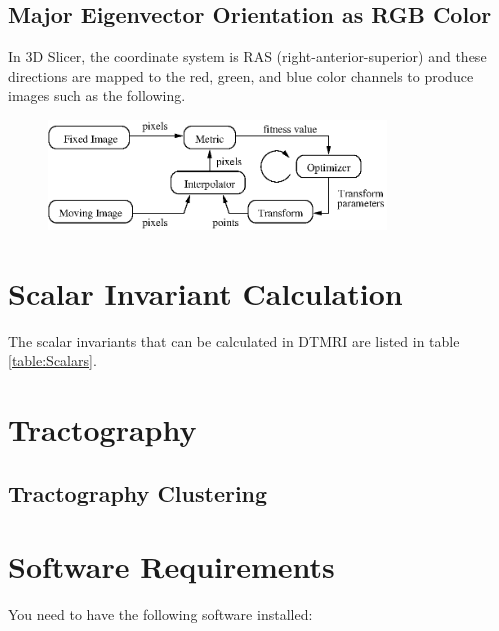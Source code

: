 \documentclass{InsightArticle}
\begin{document}
\subsection{Major Eigenvector Orientation as RGB Color}

In 3D Slicer, the coordinate system is RAS (right-anterior-superior)
and these directions are mapped to the red, green, and blue color
channels to produce images such as the following.


%
%

\begin{figure}
\center
\includegraphics[width=0.8\textwidth]{RegistrationComponentsDiagram.eps}
\label{fig:RegistrationComponents}
\end{figure}



\section{Scalar Invariant Calculation}
The scalar invariants that can be calculated in DTMRI are listed in table \ref{table:Scalars}.

\section{Tractography}

\subsection{Tractography Clustering}


\section{Software Requirements}

You need to have the following software installed:
\end{document}
